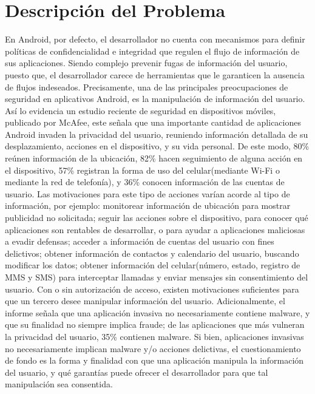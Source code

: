 \section{Descripción del Problema}
\label{sec:problema}
En Android, por defecto, el desarrollador no cuenta con mecanismos para
definir políticas de confidencialidad e integridad que regulen
el flujo de información de sus aplicaciones. Siendo complejo prevenir fugas de
información del usuario, puesto que, el desarrollador carece de herramientas que
le garanticen la ausencia de flujos indeseados.\newline
Precisamente, una de las principales preocupaciones de seguridad en aplicativos
Android, es la manipulación de información del usuario.
Así lo evidencia un
estudio reciente de seguridad en dispositivos móviles, publicado por
McAfee\cite{McAfeeReport}, este señala  que una importante cantidad de
aplicaciones Android invaden la privacidad del usuario, reuniendo información
detallada de su desplazamiento, acciones en el dispositivo, y su vida personal.
De este modo, 80\% reúnen información de la ubicación, 82\%
hacen seguimiento de alguna acción en el dispositivo, 57\%
registran la forma de uso del celular(mediante Wi-Fi o
mediante la red de telefonía), y 36\% conocen información de
las cuentas de usuario.\newline
Las motivaciones para este tipo de acciones varían acorde al tipo de
información, por ejemplo: monitorear información de ubicación para mostrar
publicidad no solicitada; seguir las acciones sobre el dispositivo, para conocer
qué aplicaciones son rentables de desarrollar, o para ayudar a aplicaciones
maliciosas a evadir defensas; acceder a información de cuentas del usuario con
fines delictivos; obtener información de contactos y calendario
del usuario, buscando modificar los datos; obtener información del
celular(número, estado, registro de MMS y SMS) para interceptar llamadas y
enviar mensajes sin consentimiento del usuario.\newline 
Con o sin autorización de acceso, existen motivaciones suficientes para que un
tercero desee manipular información del usuario.\newline
Adicionalmente, el informe señala que una aplicación invasiva no necesariamente
contiene malware, y que su finalidad no siempre implica fraude; de las
aplicaciones que más vulneran la privacidad del usuario, 35\% contienen
malware.\newline 
Si bien, aplicaciones invasivas no necesariamente implican malware y/o acciones
delictivas, el cuestionamiento de fondo es la forma y finalidad con que una
aplicación manipula la información del usuario, y qué garantías puede ofrecer el
desarrollador para que tal manipulación sea consentida.


